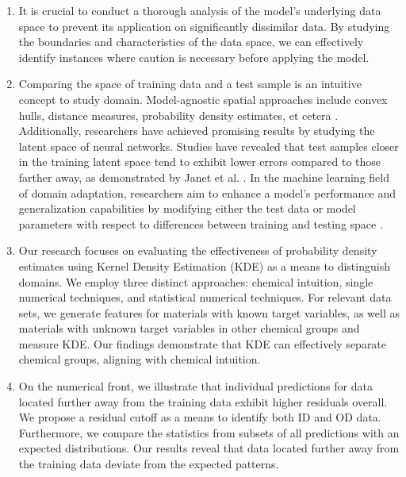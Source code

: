 \begin{enumerate}
\item It is crucial to conduct a thorough analysis of the model's underlying data space to prevent its application on significantly dissimilar data. By studying the boundaries and characteristics of the data space, we can effectively identify instances where caution is necessary before applying the model.

\item Comparing the space of training data and a test sample is an intuitive concept to study domain. Model-agnostic spatial approaches include convex hulls, distance measures, probability density estimates, et cetera \cite{Jaworska2005}. Additionally, researchers have achieved promising results by studying the latent space of neural networks. Studies have revealed that test samples closer in the training latent space tend to exhibit lower errors compared to those farther away, as demonstrated by Janet et al. \cite{Janet2019}. In the machine learning field of domain adaptation, researchers aim to enhance a model's performance and generalization capabilities by modifying either the test data or model parameters with respect to differences between training and testing space \cite{domain_adaptation, de2021adapt}.

\item Our research focuses on evaluating the effectiveness of probability density estimates using Kernel Density Estimation (KDE) as a means to distinguish domains. We employ three distinct approaches: chemical intuition, single numerical techniques, and statistical numerical techniques. For relevant data sets, we generate features for materials with known target variables, as well as materials with unknown target variables in other chemical groups and measure KDE. Our findings demonstrate that KDE can effectively separate chemical groups, aligning with chemical intuition.

\item On the numerical front, we illustrate that individual predictions for data located further away from the training data exhibit higher residuals overall. We propose a residual cutoff as a means to identify both ID and OD data. Furthermore, we compare the statistics from subsets of all predictions with an expected distributions. Our results reveal that data located further away from the training data deviate from the expected patterns.
\end{enumerate}